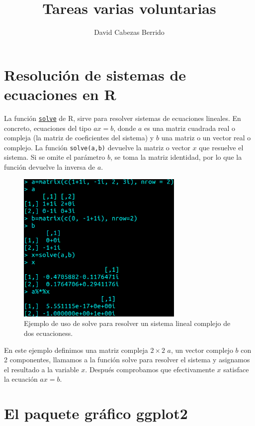 \documentclass[12pt]{article}
\title{Tareas varias voluntarias}
\author{David Cabezas Berrido}
\date{}
\begin{document}
\maketitle

\section{Resolución de sistemas de ecuaciones en R}

La función
\href{https://www.rdocumentation.org/packages/base/versions/3.6.2/topics/solve}{\texttt{solve}}
de R, sirve para resolver sistemas de ecuaciones lineales. En
concreto, ecuaciones del tipo $ax=b$, donde $a$ es una matriz cuadrada
real o compleja (la matriz de coeficientes del sistema) y $b$ una
matriz o un vector real o complejo. La función \texttt{solve(a,b)}
devuelve la matriz o vector $x$ que resuelve el sistema. Si se omite
el parámetro $b$, se toma la matriz identidad, por lo que la función
devuelve la inversa de $a$.

\begin{figure}[H]
  \centering
  \includegraphics[width=80mm]{imgs/solve}
  \caption{Ejemplo de uso de solve para resolver un sistema lineal complejo de dos ecuacioness.}
\end{figure}

En este ejemplo definimos una matriz compleja $2\times 2$ $a$, un
vector complejo $b$ con 2 componentes, llamamos a la función solve
para resolver el sistema y asignamos el resultado a la variable
$x$. Después comprobamos que efectivamente $x$ satisface la ecuación
$ax=b$.

\section{El paquete gráfico ggplot2}
\end{document}
